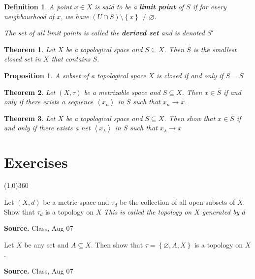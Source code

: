 \documentclass[12pt,twoside]{report}
\newtheorem{defn}{Definition}
\newtheorem{thm}{Theorem}
\newtheorem{prop}[subsection]{Proposition}
\newenvironment*{source}{\hfill\scriptsize\textbf{Source.}\space}{\par}
\begin{document}
\begin{defn}
    A point $x \in X$ is said to be a \textbf{limit point} of $S$ if for every neighbourhood of $x$, we have $\left (U \cap S\right ) \setminus \left\{ x \right\} \neq  \varnothing $.

    The set of all limit points is called the \textbf{derived set} and is denoted $S'$
\end{defn}

\begin{thm}
    Let $X$ be a topological space and $S \subseteq X$. Then $\bar{S}$ is the smallest closed set in $X$ that contains $S$.
\end{thm}

\begin{prop}
    A subset of a topological space $X$ is closed if and only if $S = \bar{S}$
\end{prop}

\begin{thm}
    Let $\left (X, \tau\right )$ be a metrizable space and $S \subseteq X$. Then $x \in \bar{S}$ if and only if there exists a sequence $\left\langle x_n\right\rangle $ in $S$ such that $x_n \to x$.
\end{thm}

\begin{thm}
    Let $X$ be a topological space and $S \subseteq X$. Then show that $x \in \bar{S}$ if and only if there exists a net $\left\langle  x_\lambda \right\rangle $ in $S$ such that $ x_\lambda \to x$
\end{thm}

\chapter{Exercises}
\line(1,0){360}

\begin{samepage}
\begin{ex}
Let $\left (X, d\right )$ be a metric space and $\tau_d$ be the collection of all open subsets of $X$. 
Show that $\tau_d$ is a topology on $X$
\vspace{0.5cm}
\textit{This is called the topology on $X$ generated by $d$}
\end{ex}
\begin{source}
Class, Aug 07
\end{source}
\end{samepage}

\begin{samepage}
\begin{ex}
Let $X$ be any set and $A \subseteq X$. Then show that 
$\tau = \left\{ \varnothing, A , X \right\}$ is a topology on $X$.
\end{ex}
\begin{source}
Class, Aug 07
\end{source}
\end{samepage}
\end{document}

